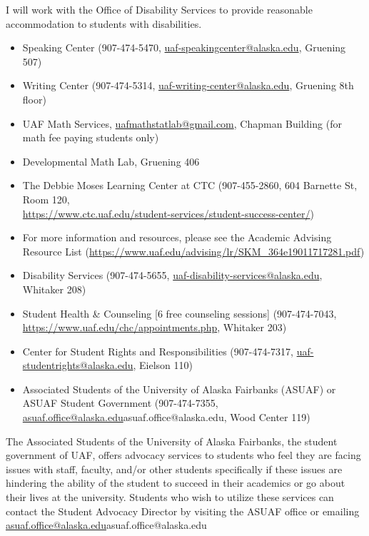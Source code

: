 \documentclass[12pt]{article}
\def\mailto#1{\href{mailto:#1}{#1}}
\begin{document}
 I will work with the Office of Disability Services to provide reasonable accommodation to students with disabilities.

\begin{itemize}
\setlength\itemsep{0em}
        \item Speaking Center (907-474-5470,
        \mailto{uaf-speakingcenter@alaska.edu}, Gruening 507)
\item Writing Center (907-474-5314, \mailto{uaf-writing-center@alaska.edu}, Gruening 8th floor)
\item UAF Math Services, \mailto{uafmathstatlab@gmail.com}, Chapman Building (for math fee paying students only)
\item Developmental Math Lab, Gruening 406
\item The Debbie Moses Learning Center at CTC (907-455-2860, 604 Barnette St, Room 120,\\ \mailto{https://www.ctc.uaf.edu/student-services/student-success-center/})
\item For more information and resources, please see the Academic Advising Resource List (\url{https://www.uaf.edu/advising/lr/SKM_364e19011717281.pdf})
\end{itemize}

\begin{itemize}
\setlength\itemsep{0em}
\item Disability Services (907-474-5655, \mailto{uaf-disability-services@alaska.edu}, Whitaker 208)
\item Student Health \& Counseling [6 free counseling sessions] (907-474-7043, \url{https://www.uaf.edu/chc/appointments.php}, Whitaker 203)
\item Center for Student Rights and Responsibilities (907-474-7317, \mailto{uaf-studentrights@alaska.edu}, Eielson 110)
\item Associated Students of the University of Alaska Fairbanks (ASUAF) or ASUAF Student Government (907-474-7355, \mailto{asuaf.office@alaska.edu}{asuaf.office@alaska.edu}, Wood Center 119)
\end{itemize}

The Associated Students of the University of Alaska Fairbanks, the student government of UAF, offers advocacy services to students who feel they are facing issues with staff, faculty, and/or other students specifically if these issues are hindering the ability of the student to succeed in their academics or go about their lives at the university. Students who wish to utilize these services can contact the Student Advocacy Director by visiting the ASUAF office or emailing \mailto{asuaf.office@alaska.edu}{asuaf.office@alaska.edu}
\end{document}
